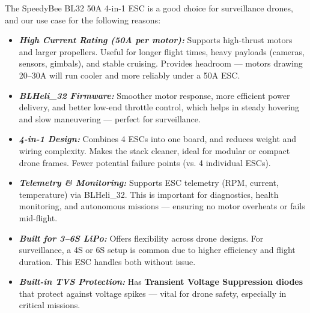 \documentclass[12pt]{report}
\begin{document}
      The SpeedyBee BL32 50A 4-in-1 ESC is a good choice for surveillance drones, and our use case for the following reasons:
      \begin{itemize}
        \item \textbf{\textit{High Current Rating (50A per motor):}} Supports high-thrust motors and larger propellers. Useful for longer flight times, heavy payloads (cameras, sensors, gimbals), and stable cruising. Provides headroom — motors drawing 20–30A will run cooler and more reliably under a 50A ESC.
        \item \textbf{\textit{BLHeli\_32 Firmware:}} Smoother motor response, more efficient power delivery, and better low-end throttle control, which helps in steady hovering and slow maneuvering — perfect for surveillance.
        \item \textbf{\textit{4-in-1 Design:}} Combines 4 ESCs into one board, and reduces weight and wiring complexity. Makes the stack cleaner, ideal for modular or compact drone frames. Fewer potential failure points (vs. 4 individual ESCs).
        \item \textbf{\textit{Telemetry \& Monitoring:}} Supports ESC telemetry (RPM, current, temperature) via BLHeli\_32. This is important for diagnostics, health monitoring, and autonomous missions — ensuring no motor overheats or fails mid-flight.
        \item \textbf{\textit{Built for 3–6S LiPo:}} Offers flexibility across drone designs. For surveillance, a 4S or 6S setup is common due to higher efficiency and flight duration. This ESC handles both without issue.
        \item \textbf{\textit{Built-in TVS Protection:}} Has \textbf{Transient Voltage Suppression diodes} that protect against voltage spikes — vital for drone safety, especially in critical missions.
      \end{itemize}
\end{document}
